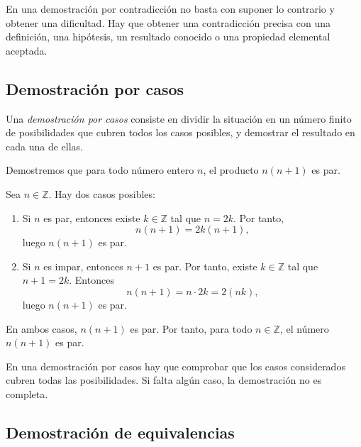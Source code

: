 \begin{advertencia}
En una demostración por contradicción no basta con suponer lo contrario y obtener una dificultad. Hay que obtener una contradicción precisa con una definición, una hipótesis, un resultado conocido o una propiedad elemental aceptada.
\end{advertencia}

\subsection{Demostración por casos}

\begin{definicion}
Una \emph{demostración por casos} consiste en dividir la situación en un número finito de posibilidades que cubren todos los casos posibles, y demostrar el resultado en cada una de ellas.
\end{definicion}

\begin{ejemplo}
Demostremos que para todo número entero $n$, el producto $n(n+1)$ es par.

Sea $n\in\mathbb{Z}$. Hay dos casos posibles:

\begin{enumerate}
  \item Si $n$ es par, entonces existe $k\in\mathbb{Z}$ tal que $n=2k$. Por tanto,
  \[
    n(n+1)=2k(n+1),
  \]
  luego $n(n+1)$ es par.

  \item Si $n$ es impar, entonces $n+1$ es par. Por tanto, existe $k\in\mathbb{Z}$ tal que $n+1=2k$. Entonces
  \[
    n(n+1)=n\cdot 2k=2(nk),
  \]
  luego $n(n+1)$ es par.
\end{enumerate}

En ambos casos, $n(n+1)$ es par. Por tanto, para todo $n\in\mathbb{Z}$, el número $n(n+1)$ es par.
\end{ejemplo}

\begin{advertencia}
En una demostración por casos hay que comprobar que los casos considerados cubren todas las posibilidades. Si falta algún caso, la demostración no es completa.
\end{advertencia}

\subsection{Demostración de equivalencias}

